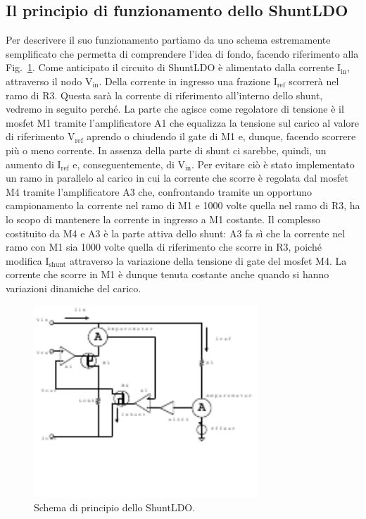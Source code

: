 
\subsection{Il principio di funzionamento dello ShuntLDO}

Per descrivere il suo funzionamento partiamo da uno schema estremamente semplificato che permetta di comprendere l'idea di fondo, facendo riferimento alla Fig.~\ref{SLDOprova}. 
Come anticipato il circuito di ShuntLDO è alimentato dalla corrente $\mathrm{I_{in}}$, attraverso il nodo $\mathrm{V_{in}}$.  Della corrente in ingresso una frazione $\mathrm{I_\mathrm{ref}}$ scorrerà nel ramo di R3. Questa sarà la corrente di riferimento all'interno dello shunt, vedremo in seguito perché. 
La parte che agisce come regolatore di tensione è il mosfet M1 tramite l'amplificatore A1 che equalizza la tensione sul carico al valore di riferimento $\mathrm{V_{ref}}$ aprendo o chiudendo il gate di M1 e, dunque, facendo scorrere più o meno corrente. 
In assenza della parte di shunt ci sarebbe, quindi, un aumento di $\mathrm{I_{ref}}$ e, conseguentemente, di $\mathrm{V_{in}}$. 
Per evitare ciò è stato implementato un ramo in parallelo al carico in cui la corrente che scorre è regolata dal mosfet M4 tramite l'amplificatore A3 che, confrontando tramite un opportuno campionamento la corrente nel ramo di M1 e 1000 volte quella nel ramo di R3, ha lo scopo di mantenere la corrente in ingresso a M1 costante. Il complesso costituito da M4 e A3 è la parte attiva dello shunt: A3 fa sì che la corrente nel ramo con M1 sia 1000 volte quella di riferimento che scorre in R3, poiché modifica $\mathrm{I_{shunt}}$ attraverso la variazione della tensione di gate del mosfet M4. 
La corrente che scorre in M1 è dunque tenuta costante anche quando si hanno variazioni dinamiche del carico.
\begin{figure}[!htbp]
\centering
\includegraphics[width=0.75\textwidth]{Immagini/SLDObase}
\caption{Schema di principio dello ShuntLDO.}
\label{SLDOprova}
\end{figure}
 

